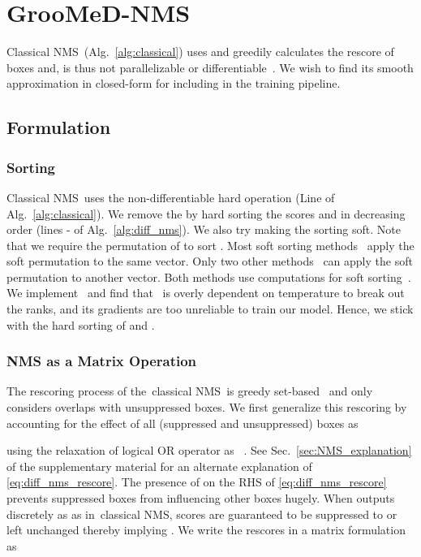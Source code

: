 \documentclass[final]{cvpr}
\newcommand{\myReferSection}[1]{Sec.~\ref{#1}}
\newcommand{\methodName}{GrooMeD-NMS}
\newcommand{\classicalNms}{classical NMS}
\newcommand{\classicalNmsCaps}{Classical NMS}
\begin{document}
\section{\methodName}
    \classicalNmsCaps~(Alg.~\ref{alg:classical}) uses  and greedily calculates the rescore  of boxes  and, is thus not parallelizable or differentiable~\cite{prokudin2017learning}.
    We wish to find its smooth approximation in closed-form for including in the training pipeline.


\subsection{Formulation}

\subsubsection{Sorting}
            \classicalNmsCaps~uses the non-differentiable hard  operation (Line  of Alg.~\ref{alg:classical}). 
            We remove the  by hard sorting the scores  and  in decreasing order (lines - of Alg.~\ref{alg:diff_nms}).
            We also try making the sorting soft. 
            Note that we require the permutation of  to sort . 
            Most soft sorting methods~\cite{ poganvcic2019differentiation,paulus2020gradient,blondel2020fast,berthet2020learning} apply the soft permutation to the same vector. 
            Only two other methods~\cite{cuturi2019differentiable,prillo2020softsort} can apply the soft permutation to another vector. Both methods use  computations for soft sorting~\cite{blondel2020fast}. 
            We implement~\cite{prillo2020softsort} and find that~\cite{prillo2020softsort} is overly dependent on temperature  to break out the ranks, and its gradients are too unreliable to train our model. 
            Hence, we stick with the hard sorting of  and .

\subsubsection{NMS as a Matrix Operation}\label{subsec:matrix_formulation}
            The rescoring process of the~\classicalNms~is greedy set-based~\cite{prokudin2017learning} and only considers overlaps with unsuppressed boxes. 
            We first generalize this rescoring by accounting for the effect of all (suppressed and unsuppressed) boxes as
            
            using the relaxation of logical OR  operator as ~\cite{van2020analyzing, li2019augmenting}.
            See \myReferSection{sec:NMS_explanation} of the supplementary material for an alternate explanation of \eqref{eq:diff_nms_rescore}.
            The presence of  on the RHS of \eqref{eq:diff_nms_rescore} prevents suppressed boxes from influencing other boxes hugely. 
            When  outputs discretely as  as in~\classicalNms, scores  are guaranteed to be suppressed to  or left unchanged  thereby implying . 
            We write the rescores  in a matrix formulation as
            
\end{document}
